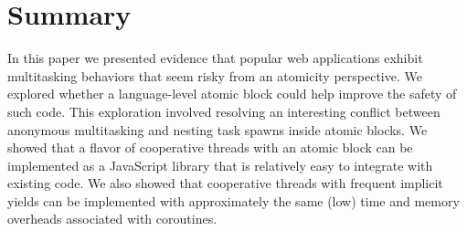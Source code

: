 \documentclass[acmsmall,anonymous,review]{acmart}\settopmatter{printfolios=true,printccs=false,printacmref=false}
\begin{document}








\section{Summary}

In this paper we presented evidence that popular web applications exhibit multitasking behaviors that seem risky from an atomicity perspective.
We explored whether a language-level atomic block could help improve the safety of such code.
This exploration involved resolving an interesting conflict between anonymous multitasking and nesting task spawns inside atomic blocks.
We showed that a flavor of cooperative threads with an atomic block can be implemented as a JavaScript library that is relatively easy to integrate with existing code.
We also showed that cooperative threads with frequent implicit yields can be implemented with approximately the same (low) time and memory overheads associated with coroutines.
\end{document}
